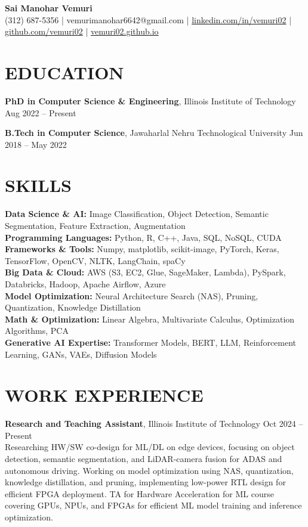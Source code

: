 \documentclass[8pt,letterpaper]{article}
\begin{document}
\begin{center}
{\Large\bfseries Sai Manohar Vemuri}\\[0.03em]
(312) 687-5356 | vemurimanohar6642@gmail.com | \href{https://www.linkedin.com/in/vemuri02}{linkedin.com/in/vemuri02} | \href{https://www.github.com/vemuri02}{github.com/vemuri02} | \href{https://vemuri02.github.io}{vemuri02.github.io}
\end{center}

\vspace{0.03em}

\section{EDUCATION}
\vspace{0.05em}
\textbf{PhD in Computer Science \& Engineering}, Illinois Institute of Technology \hfill Aug 2022 – Present

\vspace{0.05em}
\textbf{B.Tech in Computer Science}, Jawaharlal Nehru Technological University \hfill Jun 2018 – May 2022

\section{SKILLS}
\textbf{Data Science \& AI:} Image Classification, Object Detection, Semantic Segmentation, Feature Extraction, Augmentation\\
\textbf{Programming Languages:} Python, R, C++, Java, SQL, NoSQL, CUDA\\
\textbf{Frameworks \& Tools:} Numpy, matplotlib, scikit-image, PyTorch, Keras, TensorFlow, OpenCV, NLTK, LangChain, spaCy\\
\textbf{Big Data \& Cloud:} AWS (S3, EC2, Glue, SageMaker, Lambda), PySpark, Databricks, Hadoop, Apache Airflow, Azure\\
\textbf{Model Optimization:} Neural Architecture Search (NAS), Pruning, Quantization, Knowledge Distillation\\
\textbf{Math \& Optimization:} Linear Algebra, Multivariate Calculus, Optimization Algorithms, PCA\\
\textbf{Generative AI Expertise:} Transformer Models, BERT, LLM, Reinforcement Learning, GANs, VAEs, Diffusion Models

\section{WORK EXPERIENCE}
\textbf{Research and Teaching Assistant}, Illinois Institute of Technology \hfill Oct 2024 – Present\\
Researching HW/SW co-design for ML/DL on edge devices, focusing on object detection, semantic segmentation, and LiDAR-camera fusion for ADAS and autonomous driving. Working on model optimization using NAS, quantization, knowledge distillation, and pruning, implementing low-power RTL design for efficient FPGA deployment. TA for Hardware Acceleration for ML course covering GPUs, NPUs, and FPGAs for efficient ML model training and inference optimization.
\end{document}
